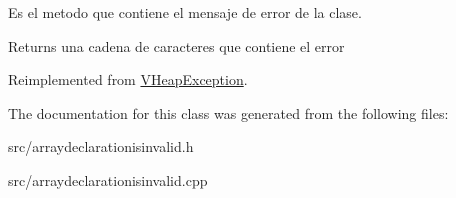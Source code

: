 Es el metodo que contiene el mensaje de error de la clase. 

\begin{DoxyReturn}{Returns}
una cadena de caracteres que contiene el error 
\end{DoxyReturn}


Reimplemented from \hyperlink{class_v_heap_exception_a58154e8dc02f9c28dfefad7897f8b2cf}{V\-Heap\-Exception}.



The documentation for this class was generated from the following files\-:\begin{DoxyCompactItemize}
\item 
src/arraydeclarationisinvalid.\-h\item 
src/arraydeclarationisinvalid.\-cpp\end{DoxyCompactItemize}
